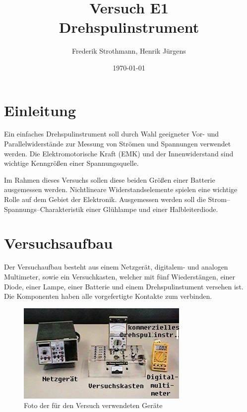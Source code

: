 \documentclass[12pt]{scrartcl}
\title{Versuch E1\\ Drehspulinstrument}
\author{Frederik Strothmann, Henrik Jürgens}
\date{\today}
\begin{document}

\maketitle
\tableofcontents
\newpage



\section{Einleitung}

Ein einfaches Drehspulinstrument soll durch Wahl geeigneter Vor- und Parallelwiderstände
zur Messung von Strömen und Spannungen verwendet werden.
Die Elektromotorische Kraft (EMK) und der Innenwiderstand sind wichtige Kenngrößen einer Spannungsquelle.

Im Rahmen dieses Versuchs sollen diese beiden Größen einer Batterie ausgemessen werden.
Nichtlineare Widerstandselemente spielen eine wichtige Rolle auf dem Gebiet der Elektronik. Ausgemessen werden soll die Strom–Spannungs–Charakteristik einer Glühlampe
und einer Halbleiterdiode.

\section{Versuchsaufbau}
Der Versuchaufbau besteht aus einem Netzgerät, digitalem- und analogen Multimeter, sowie ein Versuchkasten, welcher mit fünf Wiederstängen, einer Diode, einer Lampe, einer Batterie und einem Drehspulinstument versehen ist. Die Komponenten haben alle vorgefertigte Kontakte zum verbinden.


\begin{figure}[htbp] 
  \centering
    \includegraphics[scale = 0.5]{versuchsaufbau.JPG}
  	\caption[Foto der für den Versuch verwendeten Geräte]{Foto der für den Versuch verwendeten Geräte\footnotemark}
  \label{fig:versuchsaufbau}
\end{figure}
\end{document}
